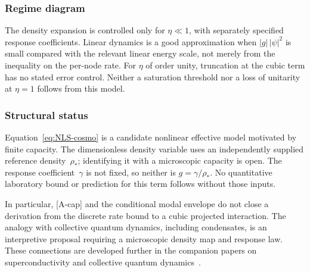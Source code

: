   \subsubsection*{Regime diagram}

    The density expansion is controlled only for $\eta\ll1$, with separately specified response coefficients.
    Linear dynamics is a good approximation when $|g|\,|\psi|^2$ is small compared with the relevant
    linear energy scale, not merely from the inequality on the per-node rate.
    For $\eta$ of order unity, truncation at the cubic term has no stated error control.
    Neither a saturation threshold nor a loss of unitarity at $\eta=1$ follows from this model.

  \subsubsection*{Structural status}

    Equation~\eqref{eq:NLS-cosmo} is a candidate nonlinear effective model motivated by finite capacity.
    The dimensionless density variable uses an independently supplied reference density~$\rho_*$;
    identifying it with a microscopic capacity is open.
    The response coefficient~$\gamma$ is not fixed, so neither is $g=\gamma/\rho_*$.
    No quantitative laboratory bound or prediction for this term follows without those inputs.

    In particular, [A-cap] and the conditional modal envelope do not close a derivation from the discrete
    rate bound to a cubic projected interaction.
    The analogy with collective quantum dynamics, including condensates, is an interpretive proposal
    requiring a microscopic density map and response law.
    These connections are developed further in the companion papers on superconductivity
    and collective quantum dynamics~\cite{Beau2026g}.

